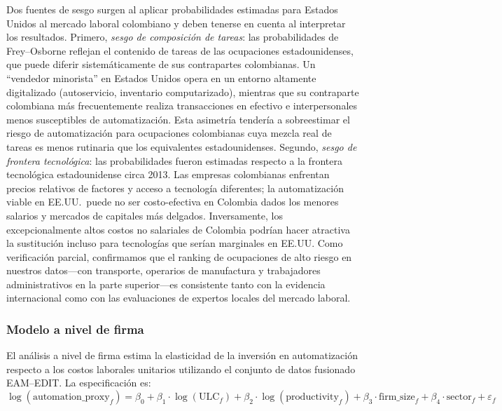 \documentclass{article}
\begin{document}
Dos fuentes de sesgo surgen al aplicar probabilidades estimadas para Estados Unidos al mercado laboral colombiano y deben tenerse en cuenta al interpretar los resultados. Primero, \textit{sesgo de composici\'on de tareas}: las probabilidades de Frey--Osborne reflejan el contenido de tareas de las ocupaciones estadounidenses, que puede diferir sistem\'aticamente de sus contrapartes colombianas. Un ``vendedor minorista'' en Estados Unidos opera en un entorno altamente digitalizado (autoservicio, inventario computarizado), mientras que su contraparte colombiana m\'as frecuentemente realiza transacciones en efectivo e interpersonales menos susceptibles de automatizaci\'on. Esta asimetr\'ia tender\'ia a sobreestimar el riesgo de automatizaci\'on para ocupaciones colombianas cuya mezcla real de tareas es menos rutinaria que los equivalentes estadounidenses. Segundo, \textit{sesgo de frontera tecnol\'ogica}: las probabilidades fueron estimadas respecto a la frontera tecnol\'ogica estadounidense circa 2013. Las empresas colombianas enfrentan precios relativos de factores y acceso a tecnolog\'ia diferentes; la automatizaci\'on viable en EE.UU.\ puede no ser costo-efectiva en Colombia dados los menores salarios y mercados de capitales m\'as delgados. Inversamente, los excepcionalmente altos costos no salariales de Colombia podr\'ian hacer atractiva la sustituci\'on incluso para tecnolog\'ias que ser\'ian marginales en EE.UU. Como verificaci\'on parcial, confirmamos que el ranking de ocupaciones de alto riesgo en nuestros datos---con transporte, operarios de manufactura y trabajadores administrativos en la parte superior---es consistente tanto con la evidencia internacional como con las evaluaciones de expertos locales del mercado laboral.

\subsubsection*{Modelo a nivel de firma}

El an\'alisis a nivel de firma estima la elasticidad de la inversi\'on en automatizaci\'on respecto a los costos laborales unitarios utilizando el conjunto de datos fusionado EAM--EDIT. La especificaci\'on es:
\begin{equation}
\log(\text{automation\_proxy}_{f}) = \beta_0 + \beta_1 \cdot \log(\text{ULC}_{f}) + \beta_2 \cdot \log(\text{productivity}_{f}) + \beta_3 \cdot \text{firm\_size}_{f} + \beta_4 \cdot \text{sector}_{f} + \varepsilon_{f}
\label{eq:firm}
\end{equation}
\end{document}

